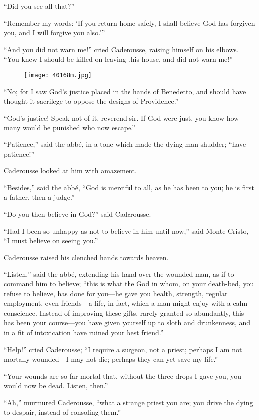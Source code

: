 “Did you see all that?”

“Remember my words: ‘If you return home safely, I shall believe God has
forgiven you, and I will forgive you also.’”

“And you did not warn me!” cried Caderousse, raising himself on his
elbows. “You knew I should be killed on leaving this house, and did not
warn me!”

\begin{figure}[ht]
\texttt{[image: 40168m.jpg]}
\end{figure}

“No; for I saw God’s justice placed in the hands of Benedetto, and
should have thought it sacrilege to oppose the designs of Providence.”

“God’s justice! Speak not of it, reverend sir. If God were just, you
know how many would be punished who now escape.”

“Patience,” said the abbé, in a tone which made the dying man shudder;
“have patience!”

Caderousse looked at him with amazement.

“Besides,” said the abbé, “God is merciful to all, as he has been to
you; he is first a father, then a judge.”

“Do you then believe in God?” said Caderousse.

“Had I been so unhappy as not to believe in him until now,” said Monte
Cristo, “I must believe on seeing you.”

Caderousse raised his clenched hands towards heaven.

“Listen,” said the abbé, extending his hand over the wounded man, as if
to command him to believe; “this is what the God in whom, on your
death-bed, you refuse to believe, has done for you—he gave you health,
strength, regular employment, even friends—a life, in fact, which a man
might enjoy with a calm conscience. Instead of improving these gifts,
rarely granted so abundantly, this has been your course—you have given
yourself up to sloth and drunkenness, and in a fit of intoxication have
ruined your best friend.”

“Help!” cried Caderousse; “I require a surgeon, not a priest; perhaps I
am not mortally wounded—I may not die; perhaps they can yet save my
life.”

“Your wounds are so far mortal that, without the three drops I gave
you, you would now be dead. Listen, then.”

“Ah,” murmured Caderousse, “what a strange priest you are; you drive
the dying to despair, instead of consoling them.”

